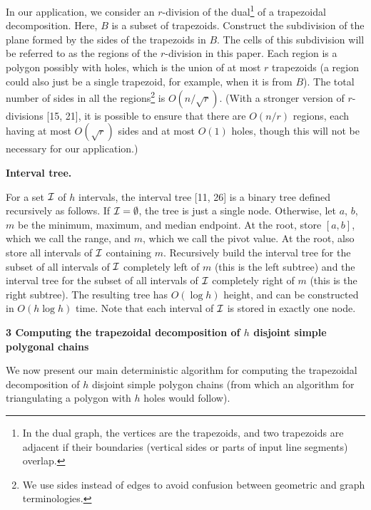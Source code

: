 In our application, we consider an $r$-division of the dual\footnote{In the dual graph, the vertices are the trapezoids, and two trapezoids are adjacent if their boundaries (vertical sides or parts of input line segments) overlap.} of a trapezoidal decomposition. Here, $B$ is a subset of trapezoids. Construct the subdivision of the plane formed by the sides of the trapezoids in $B$. The cells of this subdivision will be referred to as the regions of the $r$-division in this paper. Each region is a polygon possibly with holes, which is the union of at most $r$ trapezoids (a region could also just be a single trapezoid, for example, when it is from $B$). The total number of sides in all the regions\footnote{We use sides instead of edges to avoid confusion between geometric and graph terminologies. } is $O(n/\sqrt{r})$. (With a stronger version of $r$-divisions [15, 21], it is possible to ensure that there are $O(n/r)$ regions, each having at most $O(\sqrt{r})$ sides and at most $O(1)$ holes, though this will not be necessary for our application.)
\par
\par
\par\medskip\noindent\textbf{Interval tree.}\par
For a set ${\cal I}$ of $h$ intervals, the interval tree [11, 26] is a binary tree defined recursively as follows. If ${\cal I}=\emptyset$, the tree is just a single node. Otherwise, let $a$, $b$, $m$ be the minimum, maximum, and median endpoint. At the root, store $[a,b]$, which we call the range, and $m$, which we call the pivot value. At the root, also store all intervals of ${\cal I}$ containing $m$. Recursively build the interval tree for the subset of all intervals of ${\cal I}$ completely left of $m$ (this is the left subtree) and the interval tree for the subset of all intervals of ${\cal I}$ completely right of $m$ (this is the right subtree). The resulting tree has $O(\log h)$ height, and can be constructed in $O(h\log h)$ time. Note that each interval of ${\cal I}$ is stored in exactly one node.
\par
\par
\par\medskip\noindent\textbf{3 Computing the trapezoidal decomposition of $h$ disjoint simple polygonal chains}\par
We now present our main deterministic algorithm for computing the trapezoidal decomposition of $h$ disjoint simple polygon chains (from which an algorithm for triangulating a polygon with $h$ holes would follow).
